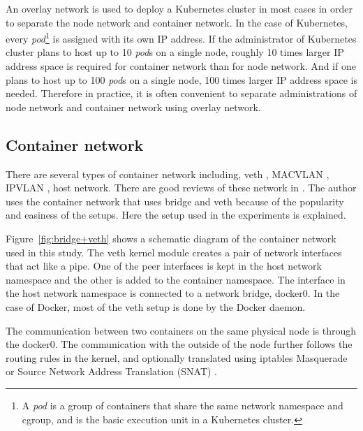   An overlay network is used to deploy a Kubernetes cluster in most cases in order to separate the node network and container network.
  In the case of Kubernetes, every {\em pod}\footnote{A {\em pod} is a group of containers that share the same network namespace and cgroup, and is the basic execution unit in a Kubernetes cluster.} is assigned with its own IP address.
  If the administrator of Kubernetes cluster plans to host up to 10 {\em pod}s on a single node, roughly 10 times larger IP address space is required for container network than for node network.
  And if one plans to host up to 100 {\em pod}s on a single node, 100 times larger IP address space is needed.
  Therefore in practice, it is often convenient to separate administrations of node network and container network using overlay network.


\subsection{Container network}

There are several types of container network including, veth \cite{bhattiprolu2008virtual}, MACVLAN \cite{rathore2010performance}, IPVLAN \cite{ipvlan}, host network.
There are good reviews of these network in  \cite{Marmol2015,claassen2016linux,struye2017assessing}.
The author uses the container network that uses  bridge and veth  because of the popularity and easiness of the setups.
Here the setup used in the experiments is explained.

Figure~\ref{fig:bridge+veth} shows a schematic diagram of the container network used in this study.
The veth kernel module creates a pair of network interfaces that act like a pipe.
One of the peer interfaces is kept in the host network namespace and the other is added to the container namespace.
The interface in the host network namespace is connected to a network bridge, docker0.
In the case of Docker, most of the veth setup is done by the Docker daemon.

The communication between two containers on the same physical node is through the docker0.
The communication with the outside of the node further follows the routing rules in the kernel,
and optionally translated using iptables Masquerade or Source Network Address Translation (SNAT) \cite{MartinA.Brown2017}.

